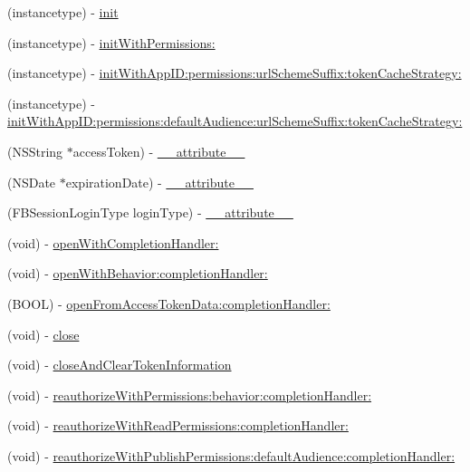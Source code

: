 \begin{DoxyCompactItemize}
(instancetype) -\/ \hyperlink{interfaceFBSession_ac5ec026f515c232cd4498cf2bc4022b4}{init}
\item 
(instancetype) -\/ \hyperlink{interfaceFBSession_a3f8419d590fb8f950aa9aee7110fb5e6}{init\+With\+Permissions\+:}
\item 
(instancetype) -\/ \hyperlink{interfaceFBSession_ae73ce3214852d1af28cbb02e7f733b37}{init\+With\+App\+I\+D\+:permissions\+:url\+Scheme\+Suffix\+:token\+Cache\+Strategy\+:}
\item 
(instancetype) -\/ \hyperlink{interfaceFBSession_a7f878c2e85b4f400378bf0c00314e7c3}{init\+With\+App\+I\+D\+:permissions\+:default\+Audience\+:url\+Scheme\+Suffix\+:token\+Cache\+Strategy\+:}
\item 
(N\+S\+String $\ast$access\+Token) -\/ \hyperlink{interfaceFBSession_a129a9e2b497ba201043bb82244156341}{\+\_\+\+\_\+attribute\+\_\+\+\_\+}
\item 
(N\+S\+Date $\ast$expiration\+Date) -\/ \hyperlink{interfaceFBSession_a42e6a02db4caa8197e8fc851bc18f1e1}{\+\_\+\+\_\+attribute\+\_\+\+\_\+}
\item 
(F\+B\+Session\+Login\+Type login\+Type) -\/ \hyperlink{interfaceFBSession_acd3c247502e2514d93ccf123ad4824f8}{\+\_\+\+\_\+attribute\+\_\+\+\_\+}
\item 
(void) -\/ \hyperlink{interfaceFBSession_a874152230789c87cd181d1f976e3715f}{open\+With\+Completion\+Handler\+:}
\item 
(void) -\/ \hyperlink{interfaceFBSession_add7058f99fde92c093a92acf192dcd0a}{open\+With\+Behavior\+:completion\+Handler\+:}
\item 
(B\+O\+OL) -\/ \hyperlink{interfaceFBSession_a669e34ba5599646255507299f7a60dac}{open\+From\+Access\+Token\+Data\+:completion\+Handler\+:}
\item 
(void) -\/ \hyperlink{interfaceFBSession_a91eccb960e90fc8cc6d24df1b2e94ce3}{close}
\item 
(void) -\/ \hyperlink{interfaceFBSession_ac4ad0564da77b3cecc0c67f762f5f1c7}{close\+And\+Clear\+Token\+Information}
\item 
(void) -\/ \hyperlink{interfaceFBSession_ac78d18a8fc82c995e326f2866ca9298f}{reauthorize\+With\+Permissions\+:behavior\+:completion\+Handler\+:}
\item 
(void) -\/ \hyperlink{interfaceFBSession_a5c15996bb59afc28460f92645cf6e7f0}{reauthorize\+With\+Read\+Permissions\+:completion\+Handler\+:}
\item 
(void) -\/ \hyperlink{interfaceFBSession_af0b2652e875c4996166b1c7ce3d12b73}{reauthorize\+With\+Publish\+Permissions\+:default\+Audience\+:completion\+Handler\+:}

\end{DoxyCompactItemize}
